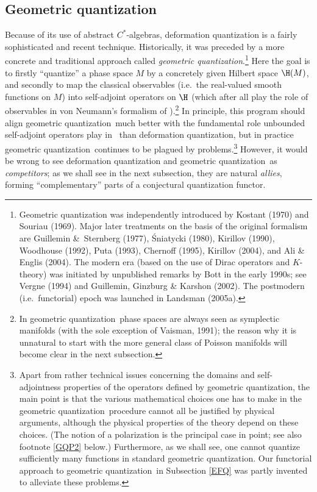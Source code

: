 \documentclass[12pt]{article}
\newcommand{\ca}{$C^*$-algebra} \newcommand{\jba}{JB-algebra}
\newcommand{\gq}{geometric quantization}
\begin{document}
\subsection{Geometric quantization}\label{GQsection}
Because of its use of abstract \ca s, deformation quantization is a fairly sophisticated and recent technique.  Historically, it was preceded by a more concrete and traditional approach called {\it \gq}.\footnote{\label{GQrefs} Geometric quantization was independently introduced by  Kostant (1970) and Souriau (1969).  Major later treatments on the basis of the original formalism are  Guillemin  \&\ Sternberg (1977), \'{S}niatycki (1980),  Kirillov (1990),  Woodhouse (1992), Puta (1993), Chernoff (1995), Kirillov (2004), and Ali \& Englis (2004). The modern era (based on the use of Dirac operators and $K$-theory) was initiated  by unpublished remarks by Bott in the early 1990s; see Vergne (1994) and Guillemin, Ginzburg \&  Karshon (2002).
 The postmodern (i.e.\ functorial) epoch was launched  in Landsman (2005a).}
 Here the goal is to firstly ``quantize'' a phase space $M$ by a concretely given Hilbert space $\H(M)$, and secondly to map the classical observables (i.e.\ the real-valued smooth functions on $M$) into self-adjoint operators on $\H$ (which after all play the role of observables in von Neumann's formalism of \qm).\footnote{In \gq\ phase spaces are always seen as symplectic manifolds (with the sole exception of Vaisman,  1991); the reason why it is unnatural to start with the more general class of Poisson manifolds will become clear in the next subsection.} In  principle, this program should align \gq\ much better with the fundamental role unbounded self-adjoint operators play in \qm\ than deformation quantization, but in practice \gq\ continues to be plagued by  problems.\footnote{\label{GQP1} Apart from rather technical issues concerning the domains and  self-adjointness properties of the operators defined by \gq, the main point is that the various mathematical choices one has to make in the \gq\ procedure
 cannot all be justified by physical arguments, although the physical properties of the theory depend on these choices. (The notion of a polarization is the principal case in point; see also footnote \ref{GQP2} below.) Furthermore, as we shall see, one cannot quantize sufficiently many functions in standard \gq. Our functorial approach to \gq\ in Subsection \ref{EFQ} was partly invented to alleviate these problems.}
  However, it would be wrong to see deformation quantization and \gq\ as {\it competitors}; as we shall see in the next subsection, they are natural {\it allies}, forming ``complementary'' parts of a conjectural quantization functor. 
\end{document}
